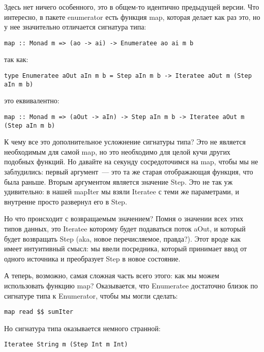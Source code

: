Здесь нет ничего особенного, это в общем-то идентично предыдущей версии. Что интересно, в пакете enumerator есть  функция map, которая делает как раз это, но у нее значительно отличается сигнатура типа:

\begin{lstlisting}
map :: Monad m => (ao -> ai) -> Enumeratee ao ai m b
\end{lstlisting}

так как:

\begin{lstlisting}
type Enumeratee aOut aIn m b = Step aIn m b -> Iteratee aOut m (Step aIn m b)
\end{lstlisting}

это еквивалентно:

\begin{lstlisting}
map :: Monad m => (aOut -> aIn) -> Step aIn m b -> Iteratee aOut m (Step aIn m b)
\end{lstlisting}

К чему все это дополнительное усложнение сигнатуры типа? Это не является необходимым для самой map, но это необходимо для целой кучи других подобных функций. Но давайте на секунду сосредоточимся на map, чтобы мы не заблудились: первый аргумент~--- это та же старая отображающая функция, что была раньше. Вторым аргументом является значение Step. Это не так уж удивительно: в нашей mapIter мы взяли Iteratee с теми же параметрами, и внутренне просто развернул его в Step.

Но что происходит с возвращаемым значением? Помня о значении всех этих типов данных, это Iteratee которому будет подаваться поток aOut, и который будет возвращать Step (aka, новое перечисляемое, правда?). Этот вроде как имеет интуитивный смысл: мы ввели посредника, который принимает ввод от одного источника и преобразует Step в новое состояние.

А теперь, возможно, самая сложная часть всего этого: как мы можем использовать функцию map? Оказывается, что Enumeratee достаточно близок по сигнатуре типа к Enumerator, чтобы мы могли сделать:

\begin{lstlisting}
map read $$ sumIter
\end{lstlisting}%

Но сигнатура типа оказывается немного странной:

\begin{lstlisting}
Iteratee String m (Step Int m Int)
\end{lstlisting}

